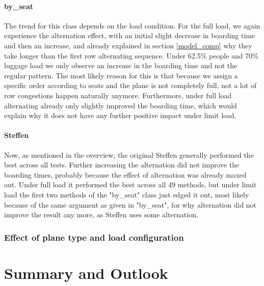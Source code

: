 \documentclass[11pt]{article}
\begin{document}
 \paragraph{by\_seat}
 The trend for this class depends on the load condition. For the full load, we again experience the alternation effect, with an initial slight decrease in boarding time and then an increase, and already explained in section \ref{model_comp} why they take longer than the first row alternating sequence. Under 62.5\% people and 70\% luggage load we only observe an increase in the boarding time and not the regular pattern. The most likely reason for this is that because we assign a specific order according to seats and the plane is not completely full, not a lot of row congestions happen naturally anymore. Furthermore, under full load alternating already only slightly improved the boarding time, which would explain why it does not have any further positive impact under limit load. 
 
 \paragraph{Steffen}
 Now, as mentioned in the overview, the original Steffen generally performed the best across all tests. Further increasing the alternation did not improve the boarding times, probably because the effect of alternation was already maxed out. Under full load it performed the best across all 49 methods, but under limit load the first two methods of the "by\_seat" class just edged it out, most likely because of the same argument as given in "by\_seat", for why alternation did not improve the result any more, as Steffen uses some alternation. 
 
 \subsubsection{Effect of plane type and load configuration}
 

\section{Summary and Outlook}
\end{document}
